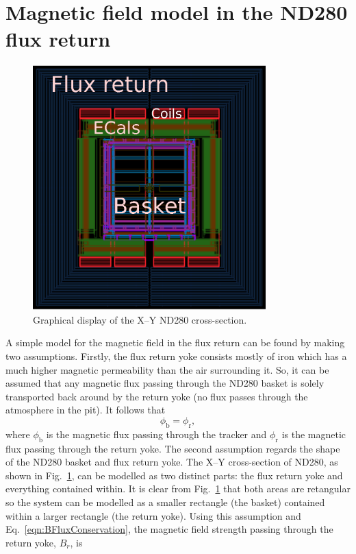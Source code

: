 \section{Magnetic field model in the ND280 flux return}
\label{sec:MagneticFieldModel}
\begin{figure}
  \centering
  \includegraphics[width=9cm]{images/magnetic_field/ND280FluxReturn}
  \caption{Graphical display of the X--Y ND280 cross-section.}
  \label{fig:ND280FluxReturn}
\end{figure}
A simple model for the magnetic field in the flux return can be found by making two assumptions.  Firstly, the flux return yoke consists mostly of iron which has a much higher magnetic permeability than the air surrounding it.  So, it can be assumed that any magnetic flux passing through the ND280 basket is solely transported back around by the return yoke (no flux passes through the atmosphere in the pit).  It follows that
\begin{equation}
  \phi_{\textrm{b}} = \phi_{\textrm{r}},
  \label{eqn:BFluxConservation}
\end{equation}
where $\phi_{\textrm{b}}$ is the magnetic flux passing through the tracker and $\phi_{\textrm{r}}$ is the magnetic flux passing through the return yoke.  The second assumption regards the shape of the ND280 basket and flux return yoke.  The X--Y cross-section of ND280, as shown in Fig.~\ref{fig:ND280FluxReturn}, can be modelled as two distinct parts: the flux return yoke and everything contained within.  It is clear from Fig.~\ref{fig:ND280FluxReturn} that both areas are retangular so the system can be modelled as a smaller rectangle (the basket) contained within a larger rectangle (the return yoke).  Using this assumption and Eq.~\ref{eqn:BFluxConservation}, the magnetic field strength passing through the return yoke, $B_{r}$, is
